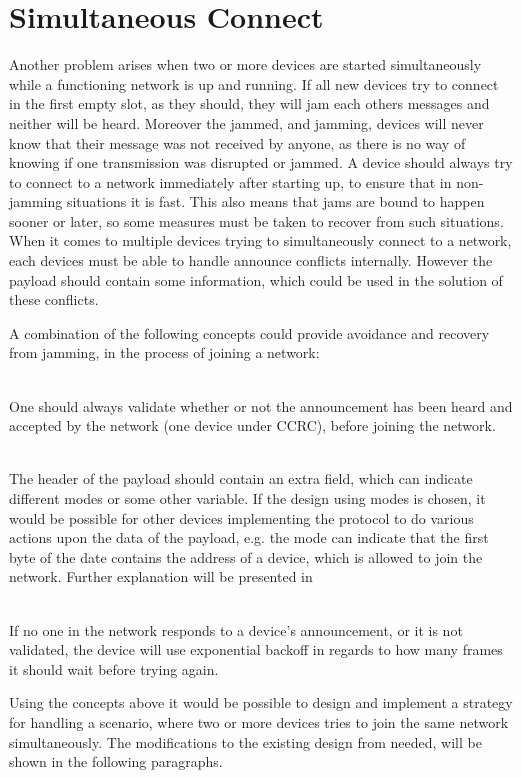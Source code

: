 \clearpage
\section{Simultaneous Connect} %
\label{sec:simultaneous_connect}

Another problem arises when two or more devices are started simultaneously while a functioning network is up and running.
If all new devices try to connect in the first empty slot, as they should, they will jam each others messages and neither will be heard.
Moreover the jammed, and jamming, devices will never know that their message was not received by anyone, as there is no way of knowing if one transmission was disrupted or jammed.
A device should always try to connect to a network immediately after starting up, to ensure that in non-jamming situations it is fast.
This also means that jams are bound to happen sooner or later, so some measures must be taken to recover from such situations.
When it comes to multiple devices trying to simultaneously connect to a network, each devices must be able to handle announce conflicts internally.
However the payload should contain some information, which could be used in the solution of these conflicts.

A combination of the following concepts could provide avoidance and recovery from jamming, in the process of joining a network: 
\begin{description}[labelindent=\parindent]
    \item[Validation]\hfill\\
    One should always validate whether or not the announcement has been heard and accepted by the network (one device under CCRC), before joining the network.
    \item[Payload Mode]\hfill\\
    The header of the payload should contain an extra field, which can indicate different modes or some other variable.
    If the design using modes is chosen, it would be possible for other devices implementing the protocol to do various actions upon the data of the payload, e.g. the mode can indicate that the first byte of the date contains the address of a device, which is allowed to join the network.
    Further explanation will be presented in 
    \item[Exponential Backoff]\hfill\\ 
    If no one in the network responds to a device's announcement, or it is not validated, the device will use exponential backoff in regards to how many frames it should wait before trying again.
\end{description} 
\noindent
Using the concepts above it would be possible to design and implement a strategy for handling a scenario, where two or more devices tries to join the same network simultaneously.
The modifications to the existing design from  needed, will be shown in the following paragraphs.


